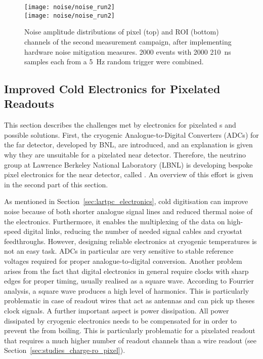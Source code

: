 \begin{figure}[htb]
	\centering
	\texttt{[image: noise/noise\_run2]} \\
	\texttt{[image: noise/noise\_run2]}
	\caption{Noise amplitude distributions of pixel (top) and ROI (bottom) channels of the second measurement campaign, after implementing hardware noise mitigation measures.
	\num{2000} events with \num{2000} \SI{210}{\nano\second} samples each from a \SI{5}{\hertz} random trigger were combined.}
	\label{fig:electronics_noise-run2}
\end{figure}



\subsection{Improved Cold Electronics for Pixelated Readouts}
\label{sec:studies_electronics_pixel}

This section describes the challenges met by electronics for pixelated \lartpc{}s and possible solutions.
First, the cryogenic Analogue-to-Digital Converters (ADCs) for the \dune{} far detector, developed by BNL, are introduced, and an explanation is given why they are unsuitable for a pixelated near detector.
Therefore, the neutrino group at Lawrence Berkeley National Laboratory (LBNL) is developing bespoke pixel electronics for the near detector, called \larpix{}.
An overview of this effort is given in the second part of this section.

As mentioned in Section~\ref{sec:lartpc_electronics}, cold digitisation can improve noise because of both shorter analogue signal lines and reduced thermal noise of the electronics.
Furthermore, it enables the multiplexing of the data on high-speed digital links, reducing the number of needed signal cables and cryostat feedthroughs.
However, designing reliable electronics at cryogenic temperatures is not an easy task.
ADCs in particular are very sensitive to stable reference voltages required for proper analogue-to-digital conversion.
Another problem arises from the fact that digital electronics in general require clocks with sharp edges for proper timing, usually realised as a square wave.
According to Fourrier analysis, a square wave produces a high level of harmonics.
This is particularly problematic in case of readout wires that act as antennas and can pick up theses clock signals.
A further important aspect is power dissipation.
All power dissipated by cryogenic electronics needs to be compensated for in order to prevent the \lar{} from boiling.
This is particularly problematic for a pixelated readout that requires a much higher number of readout channels than a wire readout (see Section~\ref{sec:studies_charge-ro_pixel}).

